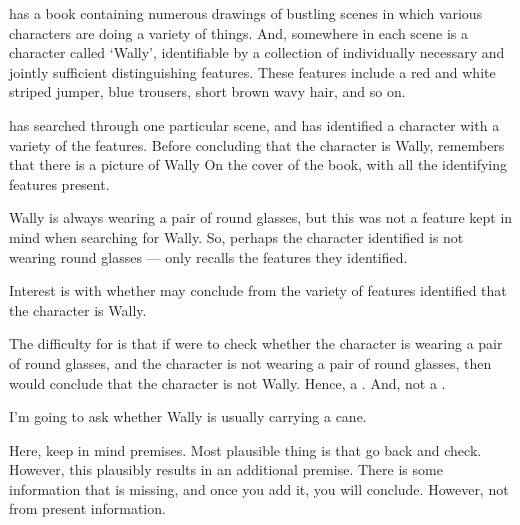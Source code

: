 \begin{note}[Wally]
  \begin{illustration}
    \label{illu:CS:wheres-wally}
     has a book containing numerous drawings of bustling scenes in which various characters are doing a variety of things.
    And, somewhere in each scene is a character called `Wally', identifiable by a collection of individually necessary and jointly sufficient distinguishing features.
    These features include a red and white striped jumper, blue trousers, short brown wavy hair, and so on.

     has searched through one particular scene, and has identified a character with a variety of the features.
    Before concluding that the character is Wally,  remembers that there is a picture of Wally On the cover of the book, with all the identifying features present.

    Wally is always wearing a pair of round glasses, but this was not a feature  kept in mind when searching for Wally.
    So, perhaps the character  identified is not wearing round glasses  ---  only recalls the features they identified.
  \end{illustration}

  Interest is with whether  may conclude from the variety of features identified that the character is Wally.

  The difficulty for  is that if  were to check whether the character is wearing a pair of round glasses, and the character is not wearing a pair of round glasses, then  would conclude that the character is not Wally.
  Hence, a \requ{}.
  And, not a \fc{}.

  I'm going to ask whether Wally is usually carrying a cane.

  Here, keep in mind premises.
  Most plausible thing is that go back and check.
  However, this plausibly results in an additional premise.
  There is some information that is missing, and once you add it, you will conclude.
  However, not from present information.
\end{note}

